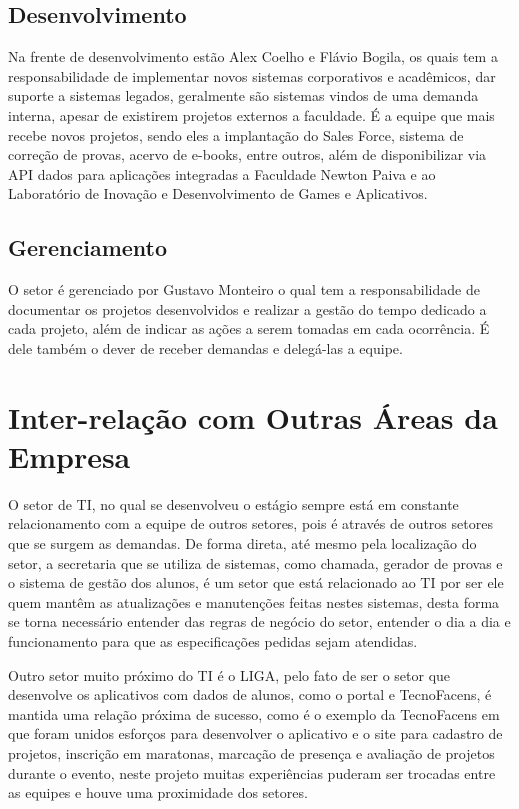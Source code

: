 \documentclass[
	12pt,				%
	oneside,			%
	a4paper,			%
	chapter=TITLE,		%
	section=TITLE,		%
	sumario=tradicional %
	english,			%
	french,				%
	spanish,			%
	brazil				%
	]{abntex2}
\begin{document}
\subsection{Desenvolvimento}
Na frente de desenvolvimento estão Alex Coelho e Flávio Bogila, os quais tem a responsabilidade de implementar novos sistemas corporativos e acadêmicos, dar suporte a sistemas legados, geralmente são sistemas vindos de uma demanda interna, apesar de existirem projetos externos a faculdade. É a equipe que mais recebe novos projetos, sendo eles a implantação do Sales Force, sistema de correção de provas, acervo de e-books, entre outros, além de disponibilizar via API dados para aplicações integradas a Faculdade Newton Paiva e ao Laboratório de Inovação e Desenvolvimento de Games e Aplicativos.

\subsection{Gerenciamento}
O setor é gerenciado por Gustavo Monteiro o qual tem a responsabilidade de documentar os projetos desenvolvidos e realizar a gestão do tempo dedicado a cada projeto, além de indicar as ações a serem tomadas em cada ocorrência. É dele também o dever de receber demandas e delegá-las a equipe.

\section{Inter-relação com Outras Áreas da Empresa}
\label{sec:relacaoareas}

O setor de TI, no qual se desenvolveu o estágio sempre está em constante relacionamento com a equipe de outros setores, pois é através de outros setores que se surgem as demandas. De forma direta, até mesmo pela localização do setor, a secretaria que se utiliza de sistemas, como chamada, gerador de provas e o sistema de gestão dos alunos, é um setor que está relacionado ao TI por ser ele quem mantêm as atualizações e manutenções feitas nestes sistemas, desta forma se torna necessário entender das regras de negócio do setor, entender o dia a dia e funcionamento para que as especificações pedidas sejam atendidas.

Outro setor muito próximo do TI é o LIGA, pelo fato de ser o setor que desenvolve os aplicativos com dados de alunos, como o portal e TecnoFacens, é mantida uma relação próxima de sucesso, como é o exemplo da TecnoFacens em que foram unidos esforços para desenvolver o aplicativo e o site para cadastro de projetos, inscrição em maratonas, marcação de presença e avaliação de projetos durante o evento, neste projeto muitas experiências puderam ser trocadas entre as equipes e houve uma proximidade dos setores.
\end{document}

